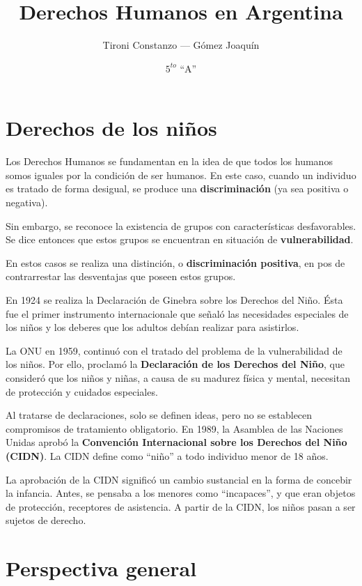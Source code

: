 \documentclass[a4paper, 12pt]{article}
\title{Derechos Humanos en Argentina}
\author{Tironi Constanzo --- Gómez Joaquín}
\date{$5^{to}$ ``A''}
\begin{document}
\maketitle
\pagebreak

\section{Derechos de los niños}

Los Derechos Humanos se fundamentan en la idea de que todos los humanos somos
iguales por la condición de ser humanos. En este caso, cuando un individuo es
tratado de forma desigual, se produce una \textbf{discriminación} (ya sea
positiva o negativa).

Sin embargo, se reconoce la existencia de grupos con características
desfavorables. Se dice entonces que estos grupos se encuentran en situación de
\textbf{vulnerabilidad}.

En estos casos se realiza una distinción, o \textbf{discriminación positiva},
en pos de contrarrestar las desventajas que poseen estos grupos.

En 1924 se realiza la Declaración de Ginebra sobre los Derechos del Niño. Ésta
fue el primer instrumento internacionale que señaló las necesidades especiales
de los niños y los deberes que los adultos debían realizar para asistirlos.

La ONU en 1959, continuó con el tratado del problema de la vulnerabilidad de
los niños. Por ello, proclamó la \textbf{ Declaración de los Derechos del
    Niño}, que consideró que los niños y niñas, a causa de su madurez física y
mental, necesitan de protección y cuidados especiales.

Al tratarse de declaraciones, solo se definen ideas, pero no se establecen
compromisos de tratamiento obligatorio. En 1989, la Asamblea de las Naciones
Unidas aprobó la \textbf{Convención Internacional sobre los Derechos del Niño
    (CIDN)}. La CIDN define como ``niño'' a todo individuo menor de 18 años.

La aprobación de la CIDN significó un cambio sustancial en la forma de concebir
la infancia. Antes, se pensaba a los menores como ``incapaces'', y que eran
objetos de protección, receptores de asistencia. A partir de la CIDN, los niños
pasan a ser sujetos de derecho.

\section{Perspectiva general}
\end{document}
